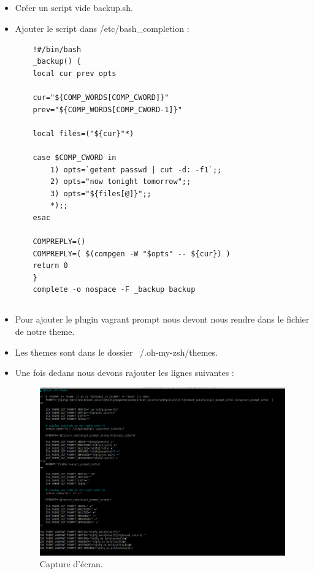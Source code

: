 \documentclass{article}
\begin{document}
\subsection{}
\begin{itemize}
    \item Créer un script vide backup.sh.
    \item Ajouter le script dans /etc/bash\_completion :
    \begin{lstlisting}
    !#/bin/bash
    _backup() {
    local cur prev opts

    cur="${COMP_WORDS[COMP_CWORD]}"
    prev="${COMP_WORDS[COMP_CWORD-1]}"

    local files=("${cur}"*)

    case $COMP_CWORD in
        1) opts=`getent passwd | cut -d: -f1`;;
        2) opts="now tonight tomorrow";;
        3) opts="${files[@]}";;
        *);;
    esac

    COMPREPLY=()
    COMPREPLY=( $(compgen -W "$opts" -- ${cur}) )
    return 0
    }
    complete -o nospace -F _backup backup
    \end{lstlisting}
\end{itemize}

\subsection{}

\begin{itemize}
\item Pour ajouter le plugin vagrant prompt nous devont nous rendre dans le fichier de notre theme.
\item Les themes sont dans le dossier ~/.oh-my-zsh/themes.
\item Une fois dedans nous devons rajouter les lignes suivantes :

\begin{figure}[h]
    \centering
    \includegraphics[width=0.7\columnwidth]{screen/1_7.png}
    \caption{\label{fig:frog}Capture d'écran.}
    \end{figure}

\end{itemize}
\end{document}
